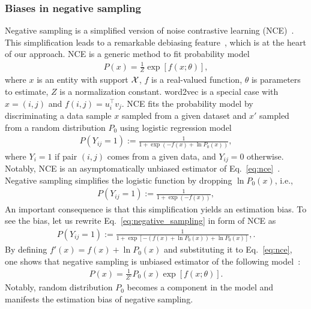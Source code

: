 \documentclass[sigconf,authordraft]{acmart}
\begin{document}
\subsubsection{Biases in negative sampling}

Negative sampling is a simplified version of noise contrastive learning (NCE)~\cite{Gutmann2010}. This simplification leads to a remarkable debiasing feature~\cite{kojaku_residual2vec_2021}, which is at the heart of our approach. NCE is a generic method to fit probability model
\begin{align}
P(x) = \frac{1}{Z}\exp\left[f(x;\theta)\right], \label{eq:nce}
\end{align}
where $x$ is an entity with support ${\cal X}$, $f$ is a real-valued function, $\theta$ is parameters to estimate, $Z$ is a normalization constant. word2vec is a special case with $x=(i,j)$ and $f(i,j) = u_i^\top v_j$. NCE fits the probability model by discriminating a data sample $x$ sampled from a given dataset and $x'$ sampled from a random distribution $P_0$ using logistic regression model
\begin{align}
P\left(Y_{ij} = 1\right):= \frac{1}{1 + \exp(-f(x) + \ln P_0(x))},
\end{align}
where $Y_i = 1$ if pair $(i,j)$ comes from a given data, and $Y_{ij}=0$ otherwise. Notably, NCE is an asymptomatically unbiased estimator of Eq.~\ref{eq:nce}~\cite{Gutmann2010,Dyer2014}. Negative sampling simplifies the logistic function by dropping $\ln P_0(x)$, i.e.,
\begin{align}
P\left(Y_{ij} = 1\right):= \frac{1}{1 + \exp(-f(x))}, \label{eq:negative_sampling}
\end{align}
An important consequence is that this simplification yields an estimation bias. To see the bias, let us rewrite Eq.~\ref{eq:negative_sampling} in form of NCE as
\begin{align}
P\left(Y_{ij} = 1\right):= \frac{1}{1 + \exp\left[-\left(f(x) + \ln P_0(x) \right)+ \ln P_0(x)\right]}, \label{eq:negative_sampling_nce}.
\end{align}
By defining $f'(x)=f(x) + \ln P_0(x)$ and substituting it to Eq.~\ref{eq:nce}, one shows that negative sampling is unbiased estimator of the following model~\cite{kojaku_residual2vec_2021}:
\begin{align}
P(x) = \frac{1}{Z'}P_0(x)\exp\left[f(x;\theta)\right].
\end{align}
Notably, random distribution $P_0$ becomes a component in the model and manifests the estimation bias of negative sampling.
\end{document}
